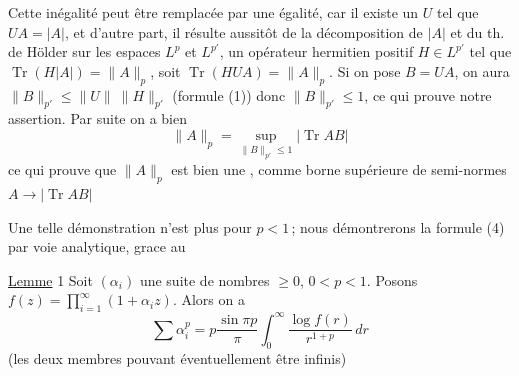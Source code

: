 Cette inégalité peut être remplacée par une égalité,
car il existe un    $U$ tel que
$UA=|A|$,  et d'autre part,  il
résulte aussitôt de la décomposition  de
$|A|$ et du th. de Hölder  sur les
espaces $L^p$ et $L^{p'}$, un opérateur hermitien
positif $H\in L^{p'}$ tel que $\operatorname{Tr}(H|A|)=\|A\|_p$,
soit \deleted{\unsure{$|$}}$\operatorname{Tr}(HUA)$\deleted{\unsure{$|$}}$=\|A\|_p$. Si on pose
$B=UA$, on aura $\|B\|_{p'}\leq\|U\|\ \|H\|_{p'}$ (formule
(1)) donc $\|B\|_{p'}\leq1$, ce qui prouve notre assertion.
Par suite on a bien
\[
\|A\|_p=\sup_{\|B\|_{p'}\leq1}|\operatorname{Tr}AB|\tag*{(7)}
\]
ce qui prouve que $\|A\|_p$ est bien une
, comme borne supérieure de
semi-normes $A\to|\operatorname{Tr}AB|$

Une telle démonstration n'est plus 
pour $p<1$\,;  nous démontrerons la formule (4)
par voie analytique, grace au

\uline{Lemme} 1 \quad Soit $(\alpha_i)$ une suite   de
nombres $\geq0$, 
  $0<p<1$. Posons $f(z)=\prod_{i=1}^{\infty}(1+\alpha_i z)$.
Alors on a
\[
\sum\alpha_i^p=p\frac{\sin\pi p}{\pi}\int_0^\infty\frac{\log f(r)}{r^{1+p}}\,dr\tag*{(8)}
\]
(les deux membres pouvant éventuellement
être infinis)
